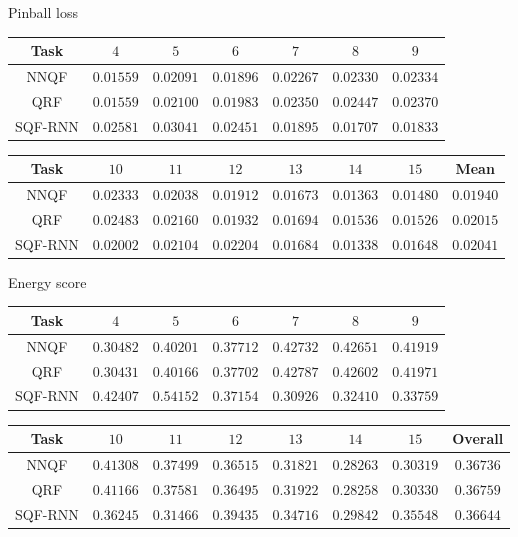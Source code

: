 \documentclass[10pt,aspectratio=169]{beamer}
\begin{document}
\begin{frame}[fragile]{Pinball loss}
    \renewcommand{\b}[1]{\mathbf{#1}}
    \begin{tabular}{c|cccccc}
        Task & \(4\) & \(5\) & \(6\) & \(7\) & \(8\) & \(9\) \\
        \hline
        NNQF    & \(\b{0.01559}\) & \(\b{0.02091}\) & \(\b{0.01896}\) & \(0.02267\)     & \(0.02330\)     & \(0.02334\)     \\
        QRF     & \(0.01559\)     & \(0.02100\)     & \(0.01983\)     & \(0.02350\)     & \(0.02447\)     & \(0.02370\)     \\
        SQF-RNN & \(0.02581\)     & \(0.03041\)     & \(0.02451\)     & \(\b{0.01895}\) & \(\b{0.01707}\) & \(\b{0.01833}\)
    \end{tabular}
    \begin{tabular}{c|cccccc|c}
        Task & \(10\) & \(11\) & \(12\) & \(13\) & \(14\) & \(15\) & Mean \\
        \hline
        NNQF    & \(0.02333\)     & \(\b{0.02038}\) & \(\b{0.01912}\) & \(\b{0.01673}\) & \(\b{0.01363}\) & \(\b{0.01480}\) & \(\b{0.01940}\) \\
        QRF     & \(0.02483\)     & \(0.02160\)     & \(0.01932\)     & \(0.01694\)     & \(0.01536\)     & \(0.01526\)     & \(0.02015\)     \\
        SQF-RNN & \(\b{0.02002}\) & \(0.02104\)     & \(0.02204\)     & \(0.01684\)     & \(0.01338\)     & \(0.01648\)     & \(0.02041\)
    \end{tabular}
\end{frame}

\begin{frame}[fragile]{Energy score}
    \renewcommand{\b}[1]{\mathbf{#1}}
    \begin{tabular}{c|cccccc}
        Task & \(4\) & \(5\) & \(6\) & \(7\) & \(8\) & \(9\) \\
        \hline
        NNQF    & \(0.30482\)     & \(0.40201\)     & \(0.37712\)     & \(0.42732\)     & \(0.42651\)     & \(0.41919\)     \\
        QRF     & \(\b{0.30431}\) & \(\b{0.40166}\) & \(0.37702\)     & \(0.42787\)     & \(0.42602\)     & \(0.41971\)     \\
        SQF-RNN & \(0.42407\)     & \(0.54152\)     & \(\b{0.37154}\) & \(\b{0.30926}\) & \(\b{0.32410}\) & \(\b{0.33759}\)
    \end{tabular}
    \begin{tabular}{c|cccccc|c}
        Task & \(10\) & \(11\) & \(12\) & \(13\) & \(14\) & \(15\) & Overall \\
        \hline
        NNQF    & \(0.41308\)     & \(0.37499\)     & \(0.36515\)     & \(\b{0.31821}\) & \(0.28263\)     & \(\b{0.30319}\) & \(0.36736\)     \\
        QRF     & \(0.41166\)     & \(0.37581\)     & \(\b{0.36495}\) & \(0.31922\)     & \(\b{0.28258}\) & \(0.30330\)     & \(0.36759\)     \\
        SQF-RNN & \(\b{0.36245}\) & \(\b{0.31466}\) & \(0.39435\)     & \(0.34716\)     & \(0.29842\)     & \(0.35548\)     & \(\b{0.36644}\)
    \end{tabular}
\end{frame}
\end{document}
